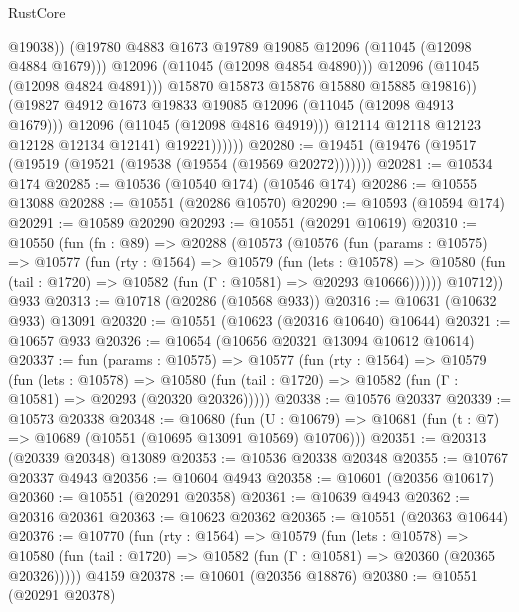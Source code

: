 \begin{lexlean}{RustCore}
\begin{coremodule}
                                @19038))
                            (@19780 @4883 @1673 @19789 @19085 @12096 (@11045 (@12098 @4884 @1679)))
                            @12096
                            (@11045 (@12098 @4854 @4890)))
                          @12096
                          (@11045 (@12098 @4824 @4891)))
                        @15870
                        @15873
                        @15876
                        @15880
                        @15885
                        @19816))
                    (@19827 @4912 @1673 @19833 @19085 @12096 (@11045 (@12098 @4913 @1679)))
                    @12096
                    (@11045 (@12098 @4816 @4919)))
                  @12114
                  @12118
                  @12123
                  @12128
                  @12134
                  @12141)
                @19221))))))
@20280 := @19451 (@19476 (@19517 (@19519 (@19521 (@19538 (@19554 (@19569 @20272)))))))
@20281 := @10534 @174
@20285 := @10536 (@10540 @174) (@10546 @174)
@20286 := @10555 @13088
@20288 := @10551 (@20286 @10570)
@20290 := @10593 (@10594 @174)
@20291 := @10589 @20290
@20293 := @10551 (@20291 @10619)
@20310 := @10550
    (fun (fn : @89) =>
    @20288
      (@10573
        (@10576
          (fun (params : @10575) =>
          @10577
            (fun (rty : @1564) =>
            @10579
              (fun (lets : @10578) =>
              @10580 (fun (tail : @1720) => @10582 (fun (Γ : @10581) => @20293 @10666))))))
        @10712))
    @933
@20313 := @10718 (@20286 (@10568 @933))
@20316 := @10631 (@10632 @933) @13091
@20320 := @10551 (@10623 (@20316 @10640) @10644)
@20321 := @10657 @933
@20326 := @10654 (@10656 @20321 @13094 @10612 @10614)
@20337 := fun (params : @10575) =>
  @10577
    (fun (rty : @1564) =>
    @10579
      (fun (lets : @10578) =>
      @10580 (fun (tail : @1720) => @10582 (fun (Γ : @10581) => @20293 (@20320 @20326)))))
@20338 := @10576 @20337
@20339 := @10573 @20338
@20348 := @10680
    (fun (U : @10679) => @10681 (fun (t : @7) => @10689 (@10551 (@10695 @13091 @10569) @10706)))
@20351 := @20313 (@20339 @20348) @13089
@20353 := @10536 @20338 @20348
@20355 := @10767 @20337 @4943
@20356 := @10604 @4943
@20358 := @10601 (@20356 @10617)
@20360 := @10551 (@20291 @20358)
@20361 := @10639 @4943
@20362 := @20316 @20361
@20363 := @10623 @20362
@20365 := @10551 (@20363 @10644)
@20376 := @10770
    (fun (rty : @1564) =>
    @10579
      (fun (lets : @10578) =>
      @10580 (fun (tail : @1720) => @10582 (fun (Γ : @10581) => @20360 (@20365 @20326)))))
    @4159
@20378 := @10601 (@20356 @18876)
@20380 := @10551 (@20291 @20378)

\end{coremodule}
\end{lexlean}
